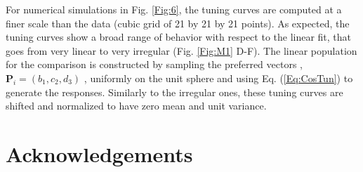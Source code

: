 \documentclass[a4paper]{article}%
\begin{document}
For numerical simulations in Fig. \ref{Fig:6}, the tuning curves are computed
at a finer scale than the data (cubic grid of 21 by 21 by 21 points). As
expected, the tuning curves show a broad range of behavior with respect to the
linear fit, that goes from very linear to very irregular (Fig. \ref{Fig:M1}
D-F). The linear population for the comparison is constructed by sampling the
preferred vectors ,$\mathbf{P}_{i} = (b_{1},c_{2},d_{3})$ , uniformly on the
unit sphere and using Eq. (\ref{Eq:CosTun}) to generate the responses.
Similarly to the irregular ones, these tuning curves are shifted and
normalized to have zero mean and unit variance.

\section{Acknowledgements}
\newpage

%

\end{document}
